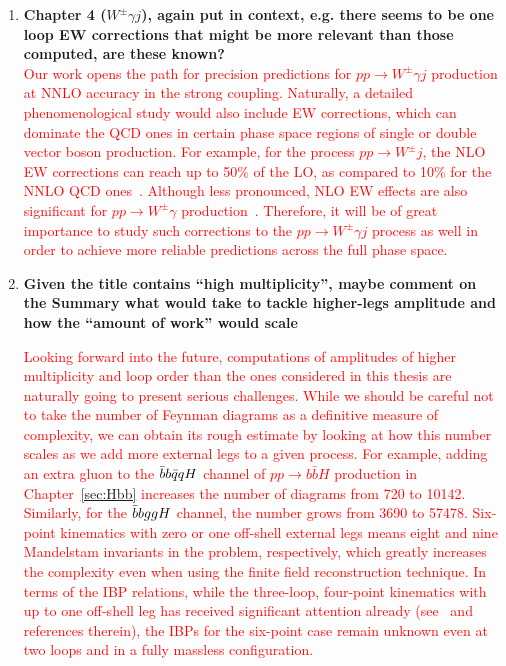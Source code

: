 \documentclass[main.tex]{subfiles}
\begin{document}
\begin{enumerate}
\item \textbf{Chapter 4 ($W^\pm \gamma j$), again put in context, e.g. there seems to be one loop EW corrections
that might be more relevant than those computed, are these known?}
\\
\textcolor{red}{Our work opens the path for precision predictions for $pp \rightarrow W^\pm \gamma j$ production at NNLO accuracy in the strong coupling. Naturally, a detailed phenomenological study would also include EW corrections, which can dominate the QCD ones in certain phase space regions of single or double vector boson production. For example, for the process $pp \rightarrow W^\pm j$, the NLO EW corrections can reach up to 50\% of the LO, as compared to 10\% for the NNLO QCD ones~\cite{Tricoli:2020uxr, Gehrmann-DeRidder:2017mvr, Boughezal:2015dva, Boughezal:2016dtm, Lindert:2017olm}. Although less pronounced, NLO EW effects are also significant for $pp \rightarrow W^\pm \gamma$ production~\cite{Cridge:2021hfr, Denner:2014bna, Accomando:2005ra, Grazzini:2015nwa, Campbell:2021mlr}. Therefore, it will be of great importance to study such corrections to the $pp \rightarrow W^\pm \gamma j$ process as well in order to achieve more reliable predictions across the full phase space.}

\item \textbf{Given the title contains “high multiplicity”, maybe comment on the Summary what
would take to tackle higher-legs amplitude and how the “amount of work” would
scale}

\textcolor{red}{Looking forward into the future, computations of amplitudes of higher multiplicity and loop order than the ones considered in this thesis are naturally going to present serious challenges. While we should be careful not to take the number of Feynman diagrams as a definitive measure of complexity, we can obtain its rough estimate by looking at how this number scales as we add more external legs to a given process. For example, adding an extra gluon to the $\bar{b}b\bar{q}qH$ channel of $pp\to b\bar{b}H$ production in Chapter~\ref{sec:Hbb} increases the number of diagrams from 720 to 10142. Similarly, for the $\bar{b}bggH$ channel, the number grows from 3690 to 57478. Six-point kinematics with zero or one off-shell external legs means eight and nine Mandelstam invariants in the problem, respectively, which greatly increases the complexity even when using the finite field reconstruction technique. In terms of the IBP relations, while the three-loop, four-point kinematics with up to one off-shell leg has received significant attention already (see~\cite{Canko:2023yoe} and references therein), the IBPs for the six-point case remain unknown even at two loops and in a fully massless configuration.}


\end{enumerate}
\end{document}
